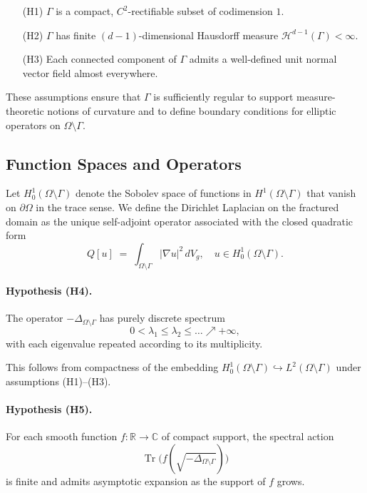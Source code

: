 \begin{itemize}
  \item[(H1)] $\Gamma$ is a compact, $C^2$-rectifiable subset of codimension $1$.
  \item[(H2)] $\Gamma$ has finite $(d-1)$-dimensional Hausdorff measure
  $\mathcal{H}^{d-1}(\Gamma)<\infty$.
  \item[(H3)] Each connected component of $\Gamma$ admits a well-defined
  unit normal vector field almost everywhere.
\end{itemize}

These assumptions ensure that $\Gamma$ is sufficiently regular to support
measure-theoretic notions of curvature and to define boundary conditions
for elliptic operators on $\Omega\setminus\Gamma$.

\subsection{Function Spaces and Operators}

Let $H^1_0(\Omega\setminus\Gamma)$ denote the Sobolev space of functions in
$H^1(\Omega\setminus\Gamma)$ that vanish on $\partial\Omega$ in the trace sense.
We define the Dirichlet Laplacian on the fractured domain as the unique
self-adjoint operator associated with the closed quadratic form
\[
Q[u] \;=\; \int_{\Omega\setminus\Gamma} |\nabla u|^2 \, dV_g,
\quad u \in H^1_0(\Omega\setminus\Gamma).
\]

\paragraph{Hypothesis (H4).}
The operator $-\Delta_{\Omega\setminus\Gamma}$ has purely discrete spectrum
\[
0 < \lambda_1 \leq \lambda_2 \leq \dots \nearrow +\infty,
\]
with each eigenvalue repeated according to its multiplicity.

This follows from compactness of the embedding
$H^1_0(\Omega\setminus\Gamma) \hookrightarrow L^2(\Omega\setminus\Gamma)$
under assumptions (H1)--(H3).

\paragraph{Hypothesis (H5).}
For each smooth function $f\colon \mathbb{R}\to\mathbb{C}$ of compact support,
the spectral action
\[
\operatorname{Tr}\bigl(f(\sqrt{-\Delta_{\Omega\setminus\Gamma}})\bigr)
\]
is finite and admits asymptotic expansion as the support of $f$ grows.

